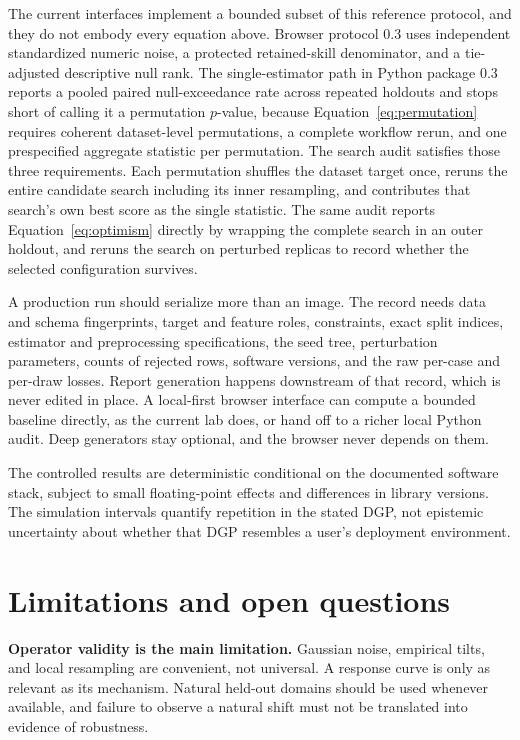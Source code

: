 \documentclass[10pt,twocolumn]{article}
\begin{document}
The current interfaces implement a bounded subset of this reference protocol, and they do not embody every equation above. Browser protocol 0.3 uses independent standardized numeric noise, a protected retained-skill denominator, and a tie-adjusted descriptive null rank. The single-estimator path in Python package 0.3 reports a pooled paired null-exceedance rate across repeated holdouts and stops short of calling it a permutation \(p\)-value, because Equation~\eqref{eq:permutation} requires coherent dataset-level permutations, a complete workflow rerun, and one prespecified aggregate statistic per permutation. The search audit satisfies those three requirements. Each permutation shuffles the dataset target once, reruns the entire candidate search including its inner resampling, and contributes that search's own best score as the single statistic. The same audit reports Equation~\eqref{eq:optimism} directly by wrapping the complete search in an outer holdout, and reruns the search on perturbed replicas to record whether the selected configuration survives.

A production run should serialize more than an image. The record needs data and schema fingerprints, target and feature roles, constraints, exact split indices, estimator and preprocessing specifications, the seed tree, perturbation parameters, counts of rejected rows, software versions, and the raw per-case and per-draw losses. Report generation happens downstream of that record, which is never edited in place. A local-first browser interface can compute a bounded baseline directly, as the current lab does, or hand off to a richer local Python audit. Deep generators stay optional, and the browser never depends on them.

The controlled results are deterministic conditional on the documented software stack, subject to small floating-point effects and differences in library versions. The simulation intervals quantify repetition in the stated DGP, not epistemic uncertainty about whether that DGP resembles a user's deployment environment.

\section{Limitations and open questions}

\textbf{Operator validity is the main limitation.} Gaussian noise, empirical tilts, and local resampling are convenient, not universal. A response curve is only as relevant as its mechanism. Natural held-out domains should be used whenever available, and failure to observe a natural shift must not be translated into evidence of robustness.
\end{document}

